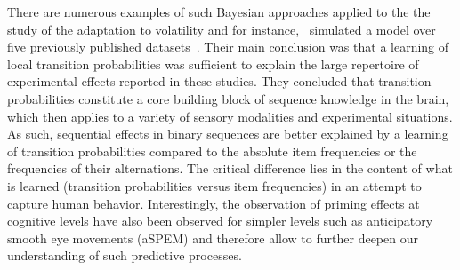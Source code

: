 \documentclass[12pt,english]{article}%
\newcommand{\citep}[1]{\parencite{#1}}
\newcommand{\citet}[1]{\textcite{#1}}
\begin{document}
There are numerous examples of such Bayesian approaches
applied to the the study of the adaptation to volatility
and for instance,~\citet{Meyniel16} simulated a model
over five previously published datasets~\citep{Squires1976, Huettel2002, Kolossa2013, Cho2002, Falk1997}.
Their main conclusion was that
a learning of local transition probabilities
was sufficient to explain the large repertoire
of experimental effects reported in these studies.
They concluded that transition probabilities constitute
a core building block of sequence knowledge in the brain,
which then applies to a variety of sensory modalities and
experimental situations.
As such, sequential effects in binary sequences are better explained
by a learning of transition probabilities
compared to the absolute item frequencies or the frequencies of their alternations.
The critical difference lies in the content
of what is learned (transition probabilities versus item frequencies)
in an attempt to capture human behavior.
Interestingly, the observation of priming effects at cognitive levels
have also been observed for simpler levels such as anticipatory smooth eye movements (aSPEM)
and therefore allow to further deepen our understanding of such predictive processes. %

\end{document}
